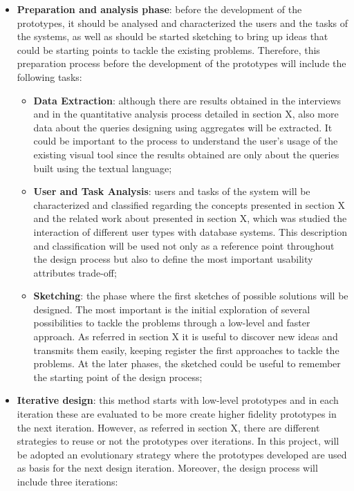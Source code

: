 \begin{itemize}
    \item \textbf{Preparation and analysis phase}: before the development of the prototypes, it should be analysed and characterized the users and the tasks of the systems, as well as should be started sketching to bring up ideas that could be starting points to tackle the existing problems. Therefore, this preparation process before the development of the prototypes will include the following tasks:
    \begin{itemize}
        \item \textbf{Data Extraction}: although there are results obtained in the interviews and in the quantitative analysis process detailed in section X, also more data about the queries designing using aggregates will be extracted. It could be important to the process to understand the user's usage of the existing visual tool since the results obtained are only about the queries built using the textual language;
        \item \textbf{User and Task Analysis}: users and tasks of the system will be characterized and classified regarding the concepts presented in section X and the related work about presented in section X, which was studied the interaction of different user types with database systems. This description and classification will be used not only as a reference point throughout the design process but also to define the most important usability attributes trade-off;
        \item \textbf{Sketching}: the phase where the first sketches of possible solutions will be designed. The most important is the initial exploration of several possibilities to tackle the problems through a low-level and faster approach. As referred in section X it is useful to discover new ideas and transmits them easily, keeping register the first approaches to tackle the problems. At the later phases, the sketched could be useful to remember the starting point of the design process;
    \end{itemize}
    \item \textbf{Iterative design}: this method starts with low-level prototypes and in each iteration these are evaluated to be more create higher fidelity prototypes in the next iteration. However, as referred in section X, there are different strategies to reuse or not the prototypes over iterations. In this project, will be adopted an evolutionary strategy where the prototypes developed are used as basis for the next design iteration. Moreover, the design process will include three iterations:

\end{itemize}
